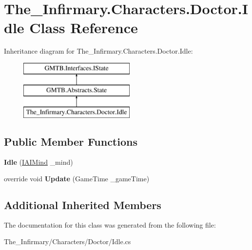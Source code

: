 \hypertarget{class_the___infirmary_1_1_characters_1_1_doctor_1_1_idle}{}\section{The\+\_\+\+Infirmary.\+Characters.\+Doctor.\+Idle Class Reference}
\label{class_the___infirmary_1_1_characters_1_1_doctor_1_1_idle}
Inheritance diagram for The\+\_\+\+Infirmary.\+Characters.\+Doctor.\+Idle\+:\begin{figure}[H]
\begin{center}
\leavevmode
\includegraphics[height=3.000000cm]{class_the___infirmary_1_1_characters_1_1_doctor_1_1_idle}
\end{center}
\end{figure}
\subsection*{Public Member Functions}
\begin{DoxyCompactItemize}
\item 
\mbox{\label{class_the___infirmary_1_1_characters_1_1_doctor_1_1_idle_a41d5376a07e7f5b0979ffec88764ab19}} 
{\bfseries Idle} (\mbox{\hyperlink{interface_g_m_t_b_1_1_interfaces_1_1_i_a_i_mind}{I\+A\+I\+Mind}} \+\_\+mind)
\item 
\mbox{\label{class_the___infirmary_1_1_characters_1_1_doctor_1_1_idle_afbc77cc7937d043ee1f6cb31617531fa}} 
override void {\bfseries Update} (Game\+Time \+\_\+game\+Time)
\end{DoxyCompactItemize}
\subsection*{Additional Inherited Members}


The documentation for this class was generated from the following file\+:\begin{DoxyCompactItemize}
\item 
The\+\_\+\+Infirmary/\+Characters/\+Doctor/Idle.\+cs\end{DoxyCompactItemize}
